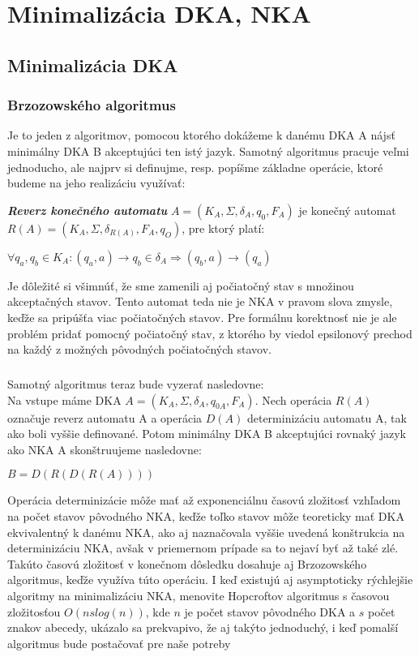 \chapter{Minimalizácia DKA, NKA}

\label{brzozowski}
\section{Minimalizácia DKA}

\subsection{Brzozowského algoritmus}
Je to jeden z algoritmov, pomocou ktorého dokážeme k danému DKA A nájsť minimálny DKA B akceptujúci ten istý jazyk. Samotný algoritmus pracuje veľmi jednoducho, ale najprv si definujme, resp. popíšme základne operácie, ktoré budeme na jeho realizáciu využívať:

\begin{defn}{\textbf {\textit {Reverz konečného automatu}}} $A=(K_A,\Sigma,\delta_A,q_{0},F_A)$ je konečný automat $R(A)=(K_A,\Sigma,\delta_{R(A)},F_A,q_{O})$, pre ktorý platí:
\\
\centerline{$\forall q_a,q_b \in K_A: (q_a,a) \rightarrow q_b \in \delta_A \Rightarrow (q_b,a)\rightarrow(q_a)$}
\end{defn}
Je dôležité si všimnúť, že sme zamenili aj počiatočný stav s množinou akceptačných stavov. Tento automat teda nie je NKA v pravom slova zmysle, keďže sa pripúšťa viac počiatočných stavov. Pre formálnu korektnosť nie je ale problém pridať pomocný počiatočný stav, z ktorého by viedol epsilonový prechod na každý z možných pôvodných počiatočných stavov.
\paragraph{}
Samotný algoritmus teraz bude vyzerať nasledovne:\\
Na vstupe máme DKA $A=(K_A,\Sigma,\delta_A,q_{0A},F_A)$. Nech operácia $R(A)$ označuje reverz automatu A a operácia $D(A)$ determinizáciu automatu A, tak ako boli vyššie definované. Potom minimálny DKA B akceptujúci rovnaký jazyk ako NKA A skonštruujeme nasledovne:
\\
\centerline{$B=D(R(D(R(A))))$}
Operácia determinizácie môže mať až exponenciálnu časovú zložitosť vzhľadom na počet stavov pôvodného NKA, keďže toľko stavov môže teoreticky mať DKA ekvivalentný k danému NKA, ako aj naznačovala vyššie uvedená konštrukcia na determinizáciu NKA, avšak v priemernom prípade sa to nejaví byť až také zlé. Takúto časovú zložitosť v konečnom dôsledku dosahuje aj Brzozowského algoritmus, keďže využíva túto operáciu. I keď existujú aj asymptoticky rýchlejšie algoritmy na minimalizáciu NKA, menovite Hopcroftov algoritmus s časovou zložitosťou $O(nslog(n))$, kde $n$ je počet stavov pôvodného DKA a $s$ počet znakov abecedy, ukázalo sa prekvapivo, že aj takýto jednoduchý, i keď pomalší algoritmus bude postačovať pre naše potreby


